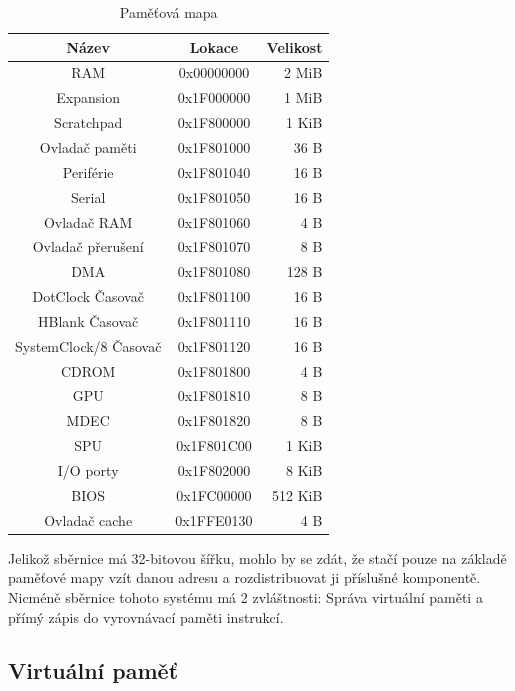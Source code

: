 \begin{table}[htbp]
\caption{Paměťová mapa}
\begin{center}
\begin{tabular}{ |c|c|r| }
 \hline
 \textbf{Název} & \textbf{Lokace} & \textbf{Velikost} \\
 \hline
 RAM & 0x00000000 & 2 MiB \\
 Expansion & 0x1F000000 & 1 MiB \\
 Scratchpad & 0x1F800000 & 1 KiB \\
 Ovladač paměti & 0x1F801000 & 36 B \\
 Periférie & 0x1F801040 & 16 B \\
 Serial & 0x1F801050 & 16 B \\
 Ovladač RAM & 0x1F801060 & 4 B \\
 Ovladač přerušení & 0x1F801070 & 8 B \\
 DMA & 0x1F801080 & 128 B \\
 DotClock Časovač & 0x1F801100 & 16 B \\
 HBlank Časovač & 0x1F801110 & 16 B \\
 SystemClock/8 Časovač & 0x1F801120 & 16 B \\
 CDROM & 0x1F801800 & 4 B \\
 GPU & 0x1F801810 & 8 B \\
 MDEC & 0x1F801820 & 8 B \\
 SPU & 0x1F801C00 & 1 KiB \\
 I/O porty & 0x1F802000 & 8 KiB \\
 BIOS & 0x1FC00000 & 512 KiB \\
 Ovladač cache & 0x1FFE0130 & 4 B \\
 \hline
\end{tabular}
\end{center}
\end{table}

Jelikož sběrnice má 32-bitovou šířku, mohlo by se zdát, že stačí pouze na základě paměťové mapy vzít danou 
adresu a rozdistribuovat ji příslušné komponentě. Nicméně sběrnice tohoto systému má 2 zvláštnosti: 
Správa virtuální paměti a přímý zápis do vyrovnávací paměti instrukcí.

\subsection{Virtuální paměť}

